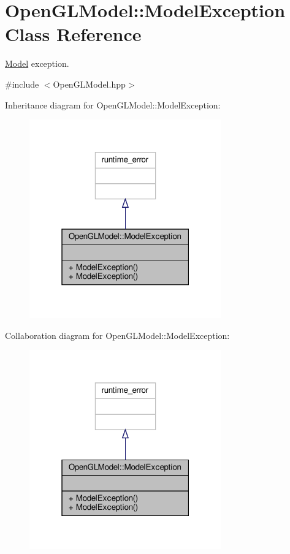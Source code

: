 \hypertarget{class_open_g_l_model_1_1_model_exception}{}\section{Open\+G\+L\+Model\+:\+:Model\+Exception Class Reference}
\label{class_open_g_l_model_1_1_model_exception}


\hyperlink{class_model}{Model} exception.  




{\ttfamily \#include $<$Open\+G\+L\+Model.\+hpp$>$}



Inheritance diagram for Open\+G\+L\+Model\+:\+:Model\+Exception\+:
\nopagebreak
\begin{figure}[H]
\begin{center}
\leavevmode
\includegraphics[width=235pt]{class_open_g_l_model_1_1_model_exception__inherit__graph}
\end{center}
\end{figure}


Collaboration diagram for Open\+G\+L\+Model\+:\+:Model\+Exception\+:
\nopagebreak
\begin{figure}[H]
\begin{center}
\leavevmode
\includegraphics[width=235pt]{class_open_g_l_model_1_1_model_exception__coll__graph}
\end{center}
\end{figure}
